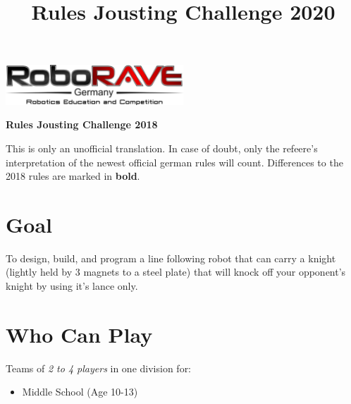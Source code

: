 \documentclass[a4paper,12pt]{article}
\begin{document}
\title{Rules Jousting Challenge 2020}

 \begin{center}
\includegraphics[width=0.5\textwidth]{logo.png}

\huge                      %
\bfseries                   %
Rules Jousting Challenge 2018
  \end{center}
This is only an unofficial translation. In case of doubt, only the refeere's interpretation of the newest
official german rules will count. Differences to the 2018 rules are marked in \textbf{bold}.
\section{Goal}
To design, build, and program a line following robot that can carry a knight (lightly held by 3
magnets to a steel plate) that will knock off your opponent’s knight by using it’s lance only.
\section{Who Can Play}
Teams of \emph{2 to 4 players} in one division for:
\begin{itemize}
	\item Middle School (Age 10-13)
\end{itemize}
\end{document}
